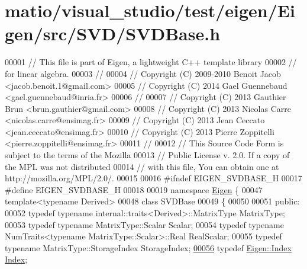 \hypertarget{matio_2visual__studio_2test_2eigen_2_eigen_2src_2_s_v_d_2_s_v_d_base_8h_source}{}\section{matio/visual\+\_\+studio/test/eigen/\+Eigen/src/\+S\+V\+D/\+S\+V\+D\+Base.h}
\label{matio_2visual__studio_2test_2eigen_2_eigen_2src_2_s_v_d_2_s_v_d_base_8h_source}

\begin{DoxyCode}
00001 \textcolor{comment}{// This file is part of Eigen, a lightweight C++ template library}
00002 \textcolor{comment}{// for linear algebra.}
00003 \textcolor{comment}{//}
00004 \textcolor{comment}{// Copyright (C) 2009-2010 Benoit Jacob <jacob.benoit.1@gmail.com>}
00005 \textcolor{comment}{// Copyright (C) 2014 Gael Guennebaud <gael.guennebaud@inria.fr>}
00006 \textcolor{comment}{//}
00007 \textcolor{comment}{// Copyright (C) 2013 Gauthier Brun <brun.gauthier@gmail.com>}
00008 \textcolor{comment}{// Copyright (C) 2013 Nicolas Carre <nicolas.carre@ensimag.fr>}
00009 \textcolor{comment}{// Copyright (C) 2013 Jean Ceccato <jean.ceccato@ensimag.fr>}
00010 \textcolor{comment}{// Copyright (C) 2013 Pierre Zoppitelli <pierre.zoppitelli@ensimag.fr>}
00011 \textcolor{comment}{//}
00012 \textcolor{comment}{// This Source Code Form is subject to the terms of the Mozilla}
00013 \textcolor{comment}{// Public License v. 2.0. If a copy of the MPL was not distributed}
00014 \textcolor{comment}{// with this file, You can obtain one at http://mozilla.org/MPL/2.0/.}
00015 
00016 \textcolor{preprocessor}{#ifndef EIGEN\_SVDBASE\_H}
00017 \textcolor{preprocessor}{#define EIGEN\_SVDBASE\_H}
00018 
00019 \textcolor{keyword}{namespace }\hyperlink{namespace_eigen}{Eigen} \{
00047 \textcolor{keyword}{template}<\textcolor{keyword}{typename} Derived>
00048 \textcolor{keyword}{class }SVDBase
00049 \{
00050 
00051 \textcolor{keyword}{public}:
00052   \textcolor{keyword}{typedef} \textcolor{keyword}{typename} internal::traits<Derived>::MatrixType MatrixType;
00053   \textcolor{keyword}{typedef} \textcolor{keyword}{typename} MatrixType::Scalar Scalar;
00054   \textcolor{keyword}{typedef} \textcolor{keyword}{typename} NumTraits<typename MatrixType::Scalar>::Real RealScalar;
00055   \textcolor{keyword}{typedef} \textcolor{keyword}{typename} MatrixType::StorageIndex StorageIndex;
\hyperlink{group___s_v_d___module_a6229a37997eca1072b52cca5ee7a2bec}{00056}   \textcolor{keyword}{typedef} \hyperlink{namespace_eigen_a62e77e0933482dafde8fe197d9a2cfde}{Eigen::Index} \hyperlink{group___s_v_d___module_a6229a37997eca1072b52cca5ee7a2bec}{Index}; 

\end{DoxyCode}
